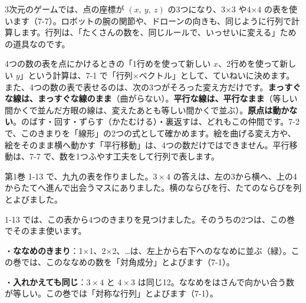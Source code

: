 3次元のゲームでは、点の座標が $(x,\ y,\ z)$ の3つになり、3×3 や4×4 の表を使います（7-7）。ロボットの腕の関節や、ドローンの向きも、同じように行列で計算します。行列は、「たくさんの数を、同じルールで、いっせいに変える」ための道具なのです。

\begin{seikaku}
4つの数の表を点にかけるときの「1行めを使って新しい $x$、2行めを使って新しい $y$」という計算は、7-1 で「行列×ベクトル」として、ていねいに決めます。また、4つの数の表で表せるのは、次の3つがそろった変え方だけです。\textbf{まっすぐな線は、まっすぐな線のまま}（曲がらない）。\textbf{平行な線は、平行なまま}（等しい間かくで並んだ方眼の線は、変えたあとも等しい間かくで並ぶ）。\textbf{原点は動かない}。のばす・回す・ずらす（かたむける）・裏返すは、どれもこの仲間です。7-2 で、このきまりを「線形」の2つの式として確かめます。絵を曲げる変え方や、絵をそのまま横へ動かす「平行移動」は、4つの数だけではできません。平行移動は、7-7 で、数を1つふやす工夫をして行列で表します。
\end{seikaku}



\label{bk:7-0:kuku}第1巻 1-13 で、九九の表を作りました。$3\times4$ の答えは、左の3から横へ、上の4からたてへ進んで出会うマスにありました。横のならびを行、たてのならびを列とよびました。

\noindent\begin{minipage}[c]{0.4\linewidth}\centering
{}
\end{minipage}\hfill
\begin{minipage}[c]{0.56\linewidth}\raggedright
1-13 では、この表から4つのきまりを見つけました。そのうちの2つは、この巻でそのまま使います。\par\vspace{3pt}
・\textbf{ななめのきまり}：1×1、2×2、…は、左上から右下へのななめに並ぶ（緑）。この巻では、このななめの数を「対角成分」とよびます（7-1）。\par
・\textbf{入れかえても同じ}：$3\times4$ と $4\times3$ は同じ12。ななめをはさんで向かい合う数が等しい。この巻では「対称な行列」とよびます（7-1）。
\end{minipage}

